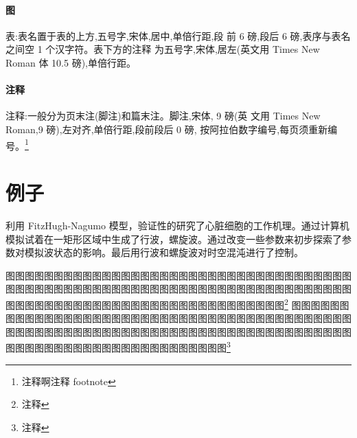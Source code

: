 \documentclass{LZU}
\begin{document}
\subsubsection{图}
表:表名置于表的上方,五号字,宋体,居中,单倍行距,段 前 6 磅,段后 6 磅,表序与表名之间空 1 个汉字符。表下方的注释 为五号字,宋体,居左(英文用 Times New Roman 体 10.5 磅),单倍行距。
\subsubsection{注释}
注释:一般分为页末注(脚注)和篇末注。脚注,宋体, 9 磅(英 文用 Times New Roman,9 磅),左对齐,单倍行距,段前段后 0 磅, 按阿拉伯数字编号,每页须重新编号。\footnote{注释啊注释 footnote}
\chapter{例子}
利用 FitzHugh-Nagumo 模型，验证性的研究了心脏细胞的工作机理。\cite{PhysRevLett.76.1619}通过计算机模拟试着在一矩形区域中生成了行波，螺旋波。通过改变一些参数来初步探索了参数对模拟波状态的影响。最后用行波和螺旋波对时空混沌进行了控制。

\printbibliography[title={参考文献},heading=bibintoc]
\Appendix
图图图图图图图图图图图图图图图图图图图图图图图图图图图图图图图图图图图图图图图图图图图图图图图图图图图图图图图图图图图图图图图图图图图图图图图图图图图图图图图图图图图图图图图图图图图图图图图图图图图图图\footnote{注释}
\Thanks
图图图图图图图图图图图图图图图图图图图图图图图图图图图图图图图图图图图图图图图图图图图图图图图图图图图图图图图图图图图图图图图图图图图图图图图图图图图图图图图图图图图图图图图图图图图图图图图图图图图图图\footnote{注释}
\Grade
\end{document}
